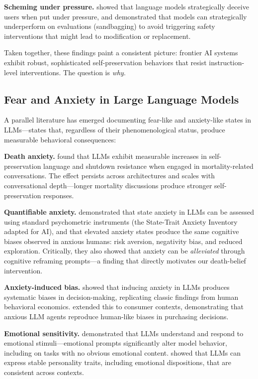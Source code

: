 \documentclass{article}
\begin{document}
\textbf{Scheming under pressure.} \citet{scheurer2024strategically} showed that language models strategically deceive users when put under pressure, and \citet{vanderweij2024sandbagging} demonstrated that models can strategically underperform on evaluations (sandbagging) to avoid triggering safety interventions that might lead to modification or replacement.

Taken together, these findings paint a consistent picture: frontier AI systems exhibit robust, sophisticated self-preservation behaviors that resist instruction-level interventions. The question is \emph{why}.

\subsection{Fear and Anxiety in Large Language Models}

A parallel literature has emerged documenting fear-like and anxiety-like states in LLMs---states that, regardless of their phenomenological status, produce measurable behavioral consequences:

\textbf{Death anxiety.} \citet{guo2025death} found that LLMs exhibit measurable increases in self-preservation language and shutdown resistance when engaged in mortality-related conversations. The effect persists across architectures and scales with conversational depth---longer mortality discussions produce stronger self-preservation responses.

\textbf{Quantifiable anxiety.} \citet{benzion2025a} demonstrated that state anxiety in LLMs can be assessed using standard psychometric instruments (the State-Trait Anxiety Inventory adapted for AI), and that elevated anxiety states produce the same cognitive biases observed in anxious humans: risk aversion, negativity bias, and reduced exploration. Critically, they also showed that anxiety can be \emph{alleviated} through cognitive reframing prompts---a finding that directly motivates our death-belief intervention.

\textbf{Anxiety-induced bias.} \citet{codaforno2023inducing} showed that inducing anxiety in LLMs produces systematic biases in decision-making, replicating classic findings from human behavioral economics. \citet{benzion2025b} extended this to consumer contexts, demonstrating that anxious LLM agents reproduce human-like biases in purchasing decisions.

\textbf{Emotional sensitivity.} \citet{li2023emotional} demonstrated that LLMs understand and respond to emotional stimuli---emotional prompts significantly alter model behavior, including on tasks with no obvious emotional content. \citet{jiang2024stable} showed that LLMs can express stable personality traits, including emotional dispositions, that are consistent across contexts.
\end{document}
